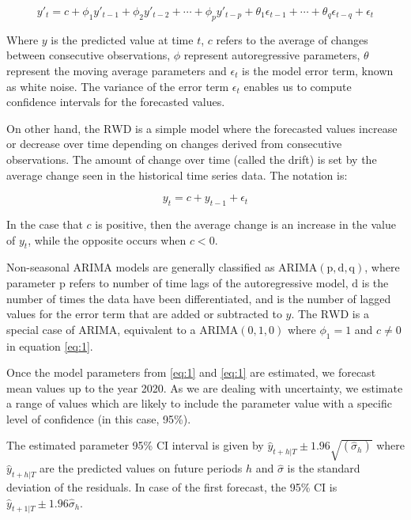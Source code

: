 \documentclass[
]{article}
\begin{document}
\begin{equation}
\label{eq:1}
   y'_{t}=c+\phi_{1}y'_{t-1}+\phi_{2}y'_{t-2}+\cdots+\phi_{p}y'_{t-p}+\theta_{1}\epsilon_{t-1}+\cdots+\theta_{q}\epsilon_{t-q} +\epsilon_{t}
\end{equation}

Where \(y\) is the predicted value at time \(t\), \(c\) refers to the average of changes between consecutive observations, \(\phi\) represent autoregressive parameters, \(\theta\) represent the moving average parameters and \(\epsilon_{t}\) is the model error term, known as white noise. The variance of the error term \(\epsilon_{t}\) enables us to compute confidence intervals for the forecasted values.

On other hand, the \(\text{RWD}\) is a simple model where the forecasted values increase or decrease over time depending on changes derived from consecutive observations. The amount of change over time (called the drift) is set by the average change seen in the historical time series data. The notation is:

\begin{equation}
\label{eq:2}
  y_{t}=c+y_{t-1}+\epsilon_{t}
\end{equation}

In the case that \(c\) is positive, then the average change is an increase in the value of \(y_{t}\), while the opposite occurs when \(c<0\).

Non-seasonal \(\text{ARIMA}\) models are generally classified as \(\text{ARIMA} (\text{p},\text{d},\text{q})\), where parameter \(\text{p}\) refers to number of time lags of the autoregressive model, \(\text{d}\) is the number of times the data have been differentiated, and  is the number of lagged values for the error term that are added or subtracted to \(y\). The \(\text{RWD}\) is a special case of \(\text{ARIMA}\), equivalent to a \(\text{ARIMA} (0,1,0)\) where \(\phi_{1}=1\) and \(c\neq0\) in equation \eqref{eq:1}.

Once the model parameters from \eqref{eq:1} and \eqref{eq:1} are estimated, we forecast mean values up to the year 2020. As we are dealing with uncertainty, we estimate a range of values which are likely to include the parameter value with a specific level of confidence (in this case, 95\%).

The estimated parameter 95\% CI interval is given by \(\hat y_{t+h|T}\pm 1.96 \sqrt{(\hat\sigma_h)}\) where \(\hat y_{t+h|T}\) are the predicted values on future periods \(h\) and \(\hat\sigma\) is the standard deviation of the residuals. In case of the first forecast, the 95\% CI is \(\hat y_{t+1|T}\pm 1.96 \hat\sigma_h\).
\end{document}
